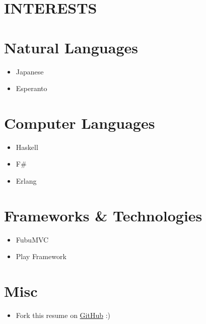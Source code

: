 \documentclass[margin]{res}
\begin{document}
\begin{resume}
\section {INTERESTS}
	\normalsize{\section{Natural Languages}}
		\begin{itemize}
			\item Japanese
			\item Esperanto
		\end{itemize}
	\normalsize{\section{Computer Languages}}
		\begin{itemize}
			\item Haskell
			\item F\#
			\item Erlang
		\end{itemize}
	\normalsize{\section{Frameworks \& Technologies}}
		\begin{itemize}
			\item FubuMVC
			\item Play Framework
		\end{itemize}
	\section{Misc}
		\begin{itemize}
			\item Fork this resume on \href{https://github.com/vsviridov/resume}{GitHub} :)
		\end{itemize}
\end{resume}
\end{document}
